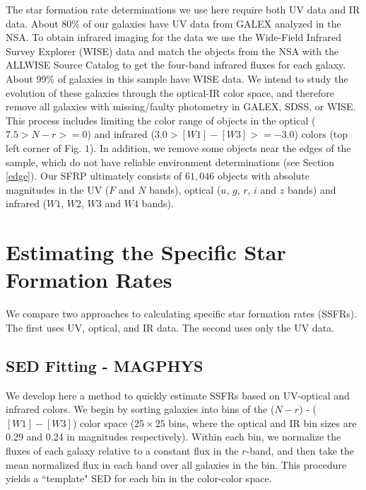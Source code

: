 The star formation rate determinations we use here require both UV data and IR data. About 80\% of our galaxies have UV data from GALEX analyzed in the NSA. To obtain infrared imaging for the data we use the Wide-Field Infrared Survey Explorer (WISE) data and match the objects from the NSA with the ALLWISE Source Catalog to get the four-band infrared fluxes for each galaxy. About 99\% of galaxies in this sample have WISE data. 
We intend to study the evolution of these galaxies through the 
optical-IR color space, and therefore remove all galaxies with 
missing/faulty photometry in GALEX, SDSS, or WISE. This process 
includes limiting the color range of objects in the optical 
($7.5> N-r >=0$) and infrared ($3.0> [W1]- [W3] >= -3.0$) 
colors (top left corner of Fig. $1$). 
In addition, we remove some objects near the edges of the sample,
which do not have reliable environment determinations (see Section 
\ref{edge}). Our SFRP ultimately consists of $61,046$ objects with 
absolute magnitudes in the UV ($F$ and $N$ bands), optical 
($u$, $g$, $r$, $i$ and $z$ bands) and infrared ($W1$, $W2$, $W3$ 
and $W4$ bands).\\

\section{Estimating the Specific Star Formation Rates}

We compare two approaches to calculating specific star 
formation rates (SSFRs). The first uses UV, optical, and 
IR data. The second uses only the UV data.

\subsection{SED Fitting - MAGPHYS}

We develop here a method to quickly estimate SSFRs based 
on UV-optical and infrared colors. We begin by sorting galaxies 
into bins of the ($N-r$) - ($[W1]-[W3]$) color space 
($25\times25$ bins, where the optical and IR bin sizes are 
0.29 and 0.24 in magnitudes respectively). Within each bin, 
we normalize the fluxes of each galaxy relative to a constant 
flux in the $r$-band, and then take the mean normalized flux 
in each band over all galaxies in the bin. This procedure 
yields a ``template" SED for each bin in the color-color space.\\

